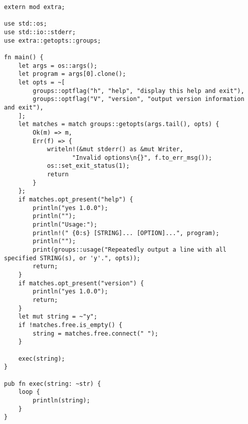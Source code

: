 \documentclass{beamer}
\begin{document}
\begin{frame}
  \begin{verbatim}
extern mod extra;

use std::os;
use std::io::stderr;
use extra::getopts::groups;

fn main() {
    let args = os::args();
    let program = args[0].clone();
    let opts = ~[
        groups::optflag("h", "help", "display this help and exit"),
        groups::optflag("V", "version", "output version information and exit"),
    ];
    let matches = match groups::getopts(args.tail(), opts) {
        Ok(m) => m,
        Err(f) => {
            writeln!(&mut stderr() as &mut Writer,
                   "Invalid options\n{}", f.to_err_msg());
            os::set_exit_status(1);
            return
        }
    };
    if matches.opt_present("help") {
        println("yes 1.0.0");
        println("");
        println("Usage:");
        println!(" {0:s} [STRING]... [OPTION]...", program);
        println("");
        print(groups::usage("Repeatedly output a line with all specified STRING(s), or 'y'.", opts));
        return;
    }
    if matches.opt_present("version") {
        println("yes 1.0.0");
        return;
    }
    let mut string = ~"y";
    if !matches.free.is_empty() {
        string = matches.free.connect(" ");
    }

    exec(string);
}

pub fn exec(string: ~str) {
    loop {
        println(string);
    }
}
  \end{verbatim}
\end{frame}
\end{document}
